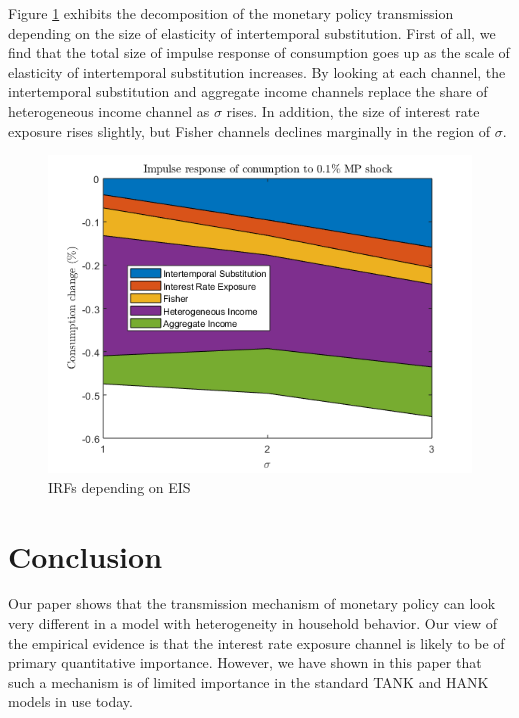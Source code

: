 \documentclass[12pt,a4paper]{article}
\begin{document}
Figure \ref{fig:IRF_C_dep_EIS} exhibits the decomposition of the monetary policy transmission depending on the size of elasticity of intertemporal substitution. First of all, we find that the total size of impulse response of consumption goes up as the scale of elasticity of intertemporal substitution increases. By looking at each channel, the intertemporal substitution and aggregate income channels replace the share of heterogeneous income channel as $\sigma$ rises. In addition, the size of interest rate exposure rises slightly, but Fisher channels declines marginally in the region of $\sigma$.


\begin{figure}[!ht]
	\begin{centering}
		\includegraphics[scale=0.8]{../Matlab/Figures/IRF_C_decom_depending_on_signa.png} 
		\caption{IRFs depending on EIS}
		\label{fig:IRF_C_dep_EIS}
	\end{centering}
\end{figure}


\section{Conclusion}
Our paper shows that the transmission mechanism of monetary policy can look very different in a model with heterogeneity in household behavior. Our view of the empirical evidence is that the interest rate exposure channel is likely to be of primary quantitative importance. However, we have shown in this paper that such a mechanism is of limited importance in the standard TANK and HANK models in use today.
\end{document}
